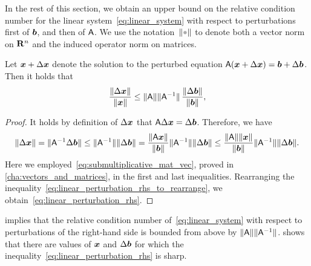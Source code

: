 In the rest of this section,
we obtain an upper bound on the relative condition number for the linear system~\eqref{eq:linear_system} with respect to perturbations first of $\mathbf{\boldsymbol{b}}$,
and then of $\mathsf A$.
We use the notation~$\norm{\placeholder}$ to denote both a vector norm on $\mathbf R^n$ and the induced operator norm on matrices.

\begin{proposition}
    \label{proposition:linear_perturbation_rhs}
    Let $\mathbf{\boldsymbol{x}} + \Delta \mathbf{\boldsymbol{x}}$ denote the solution to the perturbed equation $\mathsf A (\mathbf{\boldsymbol{x}} + \Delta \mathbf{\boldsymbol{x}}) = \mathbf{\boldsymbol{b}} + \Delta \mathbf{\boldsymbol{b}}$.
    Then it holds that
    \begin{equation}
        \label{eq:linear_perturbation_rhs}
        \frac{\lVert\Delta \mathbf{\boldsymbol{x}}\rVert}{\lVert\mathbf{\boldsymbol{x}}\rVert} \leq \lVert\mathsf A\rVert \lVert\mathsf A^{-1}\rVert \, \frac{\lVert\Delta \mathbf{\boldsymbol{b}}\rVert}{\lVert\mathbf{\boldsymbol{b}}\rVert},
    \end{equation}
\end{proposition}
\begin{proof}
    It holds by definition of $\Delta \mathbf{\boldsymbol{x}}$ that $\mathsf A \Delta \mathbf{\boldsymbol{x}} = \Delta \mathbf{\boldsymbol{b}}$.
    Therefore, we have
    \begin{equation}
        \label{eq:linear_perturbation_rhs_to_rearrange}
        \lVert\Delta \mathbf{\boldsymbol{x}}\rVert
        = \lVert\mathsf A^{-1} \Delta \mathbf{\boldsymbol{b}}\rVert
        \leq \lVert\mathsf A^{-1}\rVert \lVert\Delta \mathbf{\boldsymbol{b}}\rVert
        = \frac{\lVert\mathsf A \mathbf{\boldsymbol{x}}\rVert}{\lVert\mathbf{\boldsymbol{b}}\rVert} \lVert\mathsf A^{-1}\rVert \lVert\Delta \mathbf{\boldsymbol{b}}\rVert
        \leq \frac{\lVert\mathsf A\rVert \lVert\mathbf{\boldsymbol{x}}\rVert}{\lVert\mathbf{\boldsymbol{b}}\rVert} \lVert\mathsf A^{-1}\rVert \lVert\Delta \mathbf{\boldsymbol{b}}\rVert.
    \end{equation}
    Here we employed~\eqref{eq:submultiplicative_mat_vec},
    proved in \cref{cha:vectors_and_matrices},
    in the first and last inequalities.
    Rearranging the inequality~\eqref{eq:linear_perturbation_rhs_to_rearrange},
    we obtain~\eqref{eq:linear_perturbation_rhs}.
\end{proof}
 implies that
the relative condition number of~\eqref{eq:linear_system} with respect to perturbations of the right-hand side is bounded from above by $\lVert\mathsf A\rVert \lVert\mathsf A^{-1}\rVert$.
 shows that there are values of $\mathbf{\boldsymbol{x}}$ and $\Delta \mathbf{\boldsymbol{b}}$ for which the inequality~\eqref{eq:linear_perturbation_rhs} is sharp.

